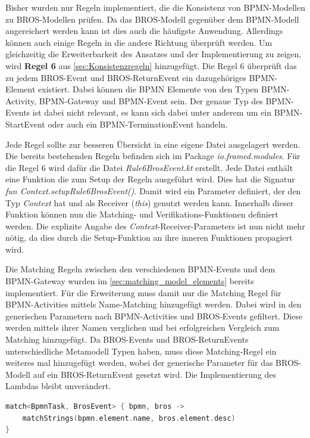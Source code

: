 Bisher wurden nur Regeln implementiert, die die Konsistenz von BPMN-Modellen zu BROS-Modellen prüfen.
Da das BROS-Modell gegenüber dem BPMN-Modell angereichert werden kann ist dies auch die häufigste Anwendung.
Allerdings können auch einige Regeln in die andere Richtung überprüft werden.
Um gleichzeitig die Erweiterbarkeit des Ansatzes und der Implementierung zu zeigen, wird \textbf{Regel 6} aus \cref{sec:Konsistenzregeln} hinzugefügt.
Die Regel 6 überprüft das zu jedem BROS-Event und BROS-ReturnEvent ein dazugehöriges BPMN-Element existiert. 
Dabei können die BPMN Elemente von den Typen BPMN-Activity, BPMN-Gateway und BPMN-Event sein. 
Der genaue Typ des BPMN-Events ist dabei nicht relevant, es kann sich dabei unter anderem um ein BPMN-StartEvent oder auch ein BPMN-TerminationEvent handeln.

Jede Regel sollte zur besseren Übersicht in eine eigene Datei ausgelagert werden.
Die bereits bestehenden Regeln befinden sich im Package \emph{io.framed.modules}.
Für die Regel 6 wird dafür die Datei \emph{Rule6BrosEvent.kt} erstellt.
Jede Datei enthält eine Funktion die zum Setup der Regeln ausgeführt wird.
Dies hat die Signatur \emph{fun Context.setupRule6BrosEvent()}.
Damit wird ein Parameter definiert, der den Typ \emph{Context} hat und als Receiver (\emph{this}) genutzt werden kann.
Innerhalb dieser Funktion können nun die Matching- und Verifikations-Funktionen definiert werden.
Die explizite Angabe des \emph{Context}-Receiver-Parameters ist nun nicht mehr nötig, da dies durch die Setup-Funktion an ihre inneren Funktionen propagiert wird. 

Die Matching Regeln zwischen den verschiedenen BPMN-Events und dem BPMN-Gateway wurden im \cref{sec:matching_model_elements} bereits implementiert.
Für die Erweiterung muss damit nur die Matching Regel für BPMN-Activities mittels Name-Matching hinzugefügt werden.
Dabei wird in den generischen Parametern nach BPMN-Activities und BROS-Events gefiltert.
Diese werden mittels ihrer Namen verglichen und bei erfolgreichen Vergleich zum Matching hinzugefügt.
Da BROS-Events und BROS-ReturnEvents unterschiedliche Metamodell Typen haben, muss diese Matching-Regel ein weiteres mal hinzugefügt werden, wobei der generische Parameter für das BROS-Modell auf ein BROS-ReturnEvent gesetzt wird.
Die Implementierung des Lambdas bleibt unverändert.

\begin{lstlisting}[language=Kotlin, caption=Matching Regel zwischen BPMN-Activities und BROS-Events, label=lst:matching_activity_event]
match<BpmnTask, BrosEvent> { bpmn, bros ->
    matchStrings(bpmn.element.name, bros.element.desc)
}
\end{lstlisting}

